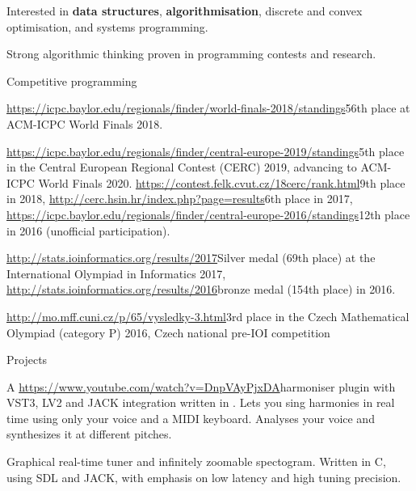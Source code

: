 
Interested in {\bf data structures}, {\bf algorithmisation}, discrete and convex
optimisation, and systems programming.

Strong algorithmic thinking proven in programming contests and research.

\sekce Competitive programming

\url{https://icpc.baylor.edu/regionals/finder/world-finals-2018/standings}{56th
place} at ACM-ICPC World Finals 2018.

\url{https://icpc.baylor.edu/regionals/finder/central-europe-2019/standings}{5th place} in the Central
European Regional Contest (CERC) 2019, advancing to ACM-ICPC World Finals 2020.
\url{https://contest.felk.cvut.cz/18cerc/rank.html}{9th place} in 2018,
\url{http://cerc.hsin.hr/index.php?page=results}{6th place} in 2017,
\url{https://icpc.baylor.edu/regionals/finder/central-europe-2016/standings}{12th
place} in 2016 (unofficial participation).

\url{http://stats.ioinformatics.org/results/2017}{Silver medal (69th place)} at
the International Olympiad in Informatics 2017,
\url{http://stats.ioinformatics.org/results/2016}{bronze medal (154th place)}
in 2016.

\url{http://mo.mff.cuni.cz/p/65/vysledky-3.html}{3rd place} in the Czech
Mathematical Olympiad (category P) 2016, Czech national pre-IOI competition

\sekce Projects


A \url{https://www.youtube.com/watch?v=DnpVAyPjxDA}{harmoniser} plugin with
VST3, LV2 and JACK integration written in \Cpp. Lets you sing harmonies in
real time using only your voice and a MIDI keyboard. Analyses your voice and
synthesizes it at different pitches.


Graphical real-time tuner and infinitely zoomable spectogram.
Written in C, using SDL and JACK, with emphasis on low latency and high
tuning precision.

% 

